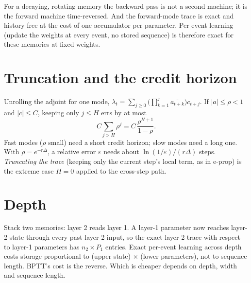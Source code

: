 \documentclass[11pt]{article}
\begin{document}
\begin{keyidea}
For a decaying, rotating memory the backward pass is not a second machine; it is the forward machine time-reversed. And the
forward-mode trace is exact and history-free at the cost of one accumulator per parameter. Per-event learning (update the
weights at every event, no stored sequence) is therefore exact for these memories at fixed weights.
\end{keyidea}

\section{Truncation and the credit horizon}
Unrolling the adjoint for one mode, $\lambda_t=\sum_{j\ge0}\big(\prod_{k=1}^{j}\overline{a_{t+k}}\big)c_{t+j}$. If $|a|\le\rho<1$ and
$|c|\le C$, keeping only $j\le H$ errs by at most
\[
C\sum_{j>H}\rho^{j}=C\,\frac{\rho^{H+1}}{1-\rho}.
\]
Fast modes ($\rho$ small) need a short credit horizon; slow modes need a long one. With $\rho=e^{-r\Delta}$, a relative error
$\varepsilon$ needs about $\ln(1/\varepsilon)/(r\Delta)$ steps. \emph{Truncating the trace} (keeping only the current step's
local term, as in e-prop) is the extreme case $H=0$ applied to the cross-step path.

\section{Depth}
Stack two memories: layer 2 reads layer 1. A layer-1 parameter now reaches layer-2 state through every past layer-2 input, so the
exact layer-2 trace with respect to layer-1 parameters has $n_2\times P_1$ entries. Exact per-event learning across depth costs
storage proportional to (upper state) $\times$ (lower parameters), not to sequence length. BPTT's cost is the reverse.
Which is cheaper depends on depth, width and sequence length.
\end{document}

